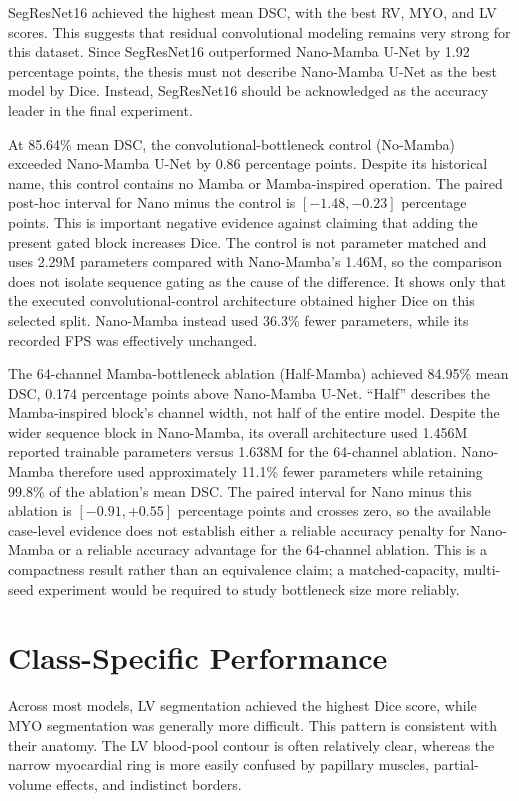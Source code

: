 SegResNet16 achieved the highest mean DSC, with the best RV, MYO, and LV scores. This suggests that residual convolutional modeling remains very strong for this dataset. Since SegResNet16 outperformed Nano-Mamba U-Net by 1.92 percentage points, the thesis must not describe Nano-Mamba U-Net as the best model by Dice. Instead, SegResNet16 should be acknowledged as the accuracy leader in the final experiment.

At 85.64\% mean DSC, the convolutional-bottleneck control (No-Mamba) exceeded Nano-Mamba U-Net by 0.86 percentage points. Despite its historical name, this control contains no Mamba or Mamba-inspired operation. The paired post-hoc interval for Nano minus the control is $[-1.48,-0.23]$ percentage points. This is important negative evidence against claiming that adding the present gated block increases Dice. The control is not parameter matched and uses 2.29M parameters compared with Nano-Mamba's 1.46M, so the comparison does not isolate sequence gating as the cause of the difference. It shows only that the executed convolutional-control architecture obtained higher Dice on this selected split. Nano-Mamba instead used 36.3\% fewer parameters, while its recorded FPS was effectively unchanged.

The 64-channel Mamba-bottleneck ablation (Half-Mamba) achieved 84.95\% mean DSC, 0.174 percentage points above Nano-Mamba U-Net. ``Half'' describes the Mamba-inspired block's channel width, not half of the entire model. Despite the wider sequence block in Nano-Mamba, its overall architecture used 1.456M reported trainable parameters versus 1.638M for the 64-channel ablation. Nano-Mamba therefore used approximately 11.1\% fewer parameters while retaining 99.8\% of the ablation's mean DSC. The paired interval for Nano minus this ablation is $[-0.91,+0.55]$ percentage points and crosses zero, so the available case-level evidence does not establish either a reliable accuracy penalty for Nano-Mamba or a reliable accuracy advantage for the 64-channel ablation. This is a compactness result rather than an equivalence claim; a matched-capacity, multi-seed experiment would be required to study bottleneck size more reliably.

\section{Class-Specific Performance}
Across most models, LV segmentation achieved the highest Dice score, while MYO segmentation was generally more difficult. This pattern is consistent with their anatomy. The LV blood-pool contour is often relatively clear, whereas the narrow myocardial ring is more easily confused by papillary muscles, partial-volume effects, and indistinct borders.


